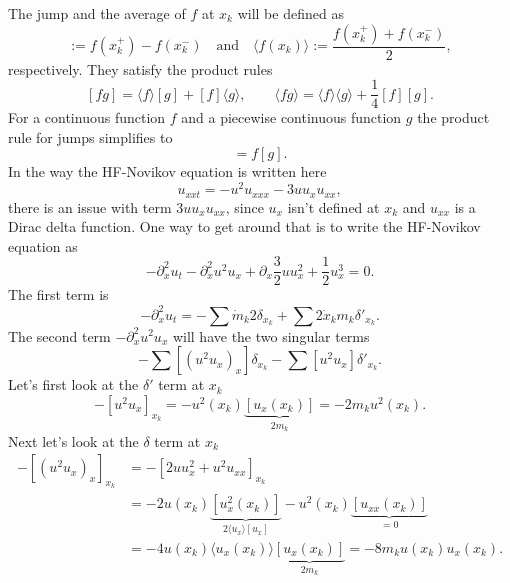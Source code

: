 \documentclass[english,master]{liumaiex}
\theoremstyle{plain}
\theoremstyle{definition}
\begin{document}
The jump and the average of $f$ at $x_k$ will be defined as
\begin{equation}
	[f(x_k)] := f(x_k^+) - f(x_k^-) \quad \text{and} \quad \langle f(x_k)\rangle := \frac{f(x_k^+) + f(x_k^-)}{2},
\end{equation}
respectively. They satisfy the product rules
\begin{equation} \label{eq:dirac_product_rules}
	[fg] = \langle f\rangle[g] + [f]\langle g\rangle, \quad \quad \langle fg\rangle = \langle f\rangle\langle g\rangle + \frac{1}{4}[f][g].
\end{equation}
%
For a continuous function $f$ and a piecewise continuous function $g$ the product rule for jumps simplifies to
\begin{equation}
	[fg] = f[g].
\end{equation}
In the way the HF-Novikov equation is written here
\begin{equation}
	u_{xxt} = -u^2u_{xxx} - 3uu_xu_{xx},
\end{equation}
there is an issue with term $3uu_xu_{xx}$, since $u_x$ isn't defined at $x_k$ and $u_{xx}$ is a Dirac delta function. One way to get around that is to write the HF-Novikov equation as
\begin{equation}
	-\partial_x^2 u_t - \partial_x^2 u^2 u_x + \partial_x \frac{3}{2} u u_x^2 + \frac{1}{2}u_x^3 = 0.
\end{equation}
%
The first term is 
\begin{equation}
	-\partial_x^2 u_t = - \sum \dot{m}_k 2 \delta_{x_k} + \sum 2 \dot{x}_k m_k \delta'_{x_k}.
\end{equation}
%
The second term $-\partial_x^2 u^2 u_x$ will have the two singular terms
\begin{equation}
	- \sum [(u^2 u_x)_x] \delta_{x_k} - \sum [u^2 u_x] \delta'_{x_k}.
\end{equation}
%
Let's first look at the $\delta'$ term at $x_k$
\begin{equation}
	- [u^2 u_x]_{x_k} = - u^2(x_k) \underbrace{[u_x(x_k)]}_{2m_k} = -2 m_k u^2(x_k).
\end{equation}
Next let's look at the $\delta$ term at $x_k$
\begin{equation}
\begin{aligned}
	- [(u^2 u_x)_x]_{x_k} &= -[2u u_x^2 + u^2 u_{xx}]_{x_k} \\
		&= - 2u(x_k) \underbrace{[u_x^2(x_k)]}_{2\langle u_x \rangle [u_x]}
		- u^2(x_k) \underbrace{[u_{xx}(x_k)]}_{=0} \\
		&= -4u(x_k) \langle u_x(x_k) \rangle \underbrace{[u_x(x_k)]}_{2m_k} = -8m_k u(x_k) u_x(x_k).
\end{aligned}
\end{equation}
\end{document}
